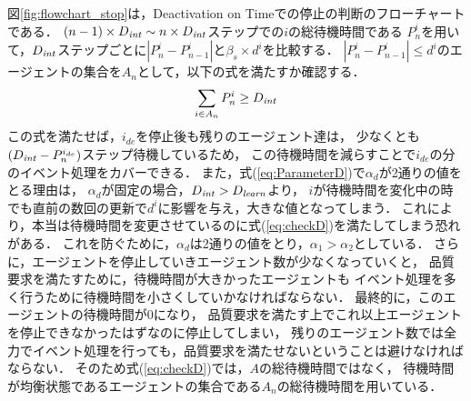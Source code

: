 \documentclass[12pt,a4j,twoside]{jarticle}
\def\AgentSet{A}
\def\DeactCheckInterval{D_{\it int}}
\def\DeactLearnInterval{D_{\it learn}}
\begin{document}
  図\ref{fig:flowchart_stop}は，Deactivation on Timeでの停止の判断のフローチャートである．
  $(n-1) \times \DeactCheckInterval \sim n \times \DeactCheckInterval$ステップでの$i$の総待機時間である
  $P^i_n$を用いて，$\DeactCheckInterval$ステップごとに$|P^i_n - P^i_{n-1}|$と$\beta_s \times d^i$を比較する．
  $|P^i_n - P^i_{n-1}| \leq d^i$のエージェントの集合を$A_n$として，以下の式を満たすか確認する．
  \begin{equation}\label{eq:checkD}
    \sum_{i \in A_n} P^i_n \geq \DeactCheckInterval
  \end{equation}
  この式を満たせば，$i_{de}$を停止後も残りのエージェント達は，
  少なくとも$(\DeactCheckInterval-P^{i_{de}}_n)$ステップ待機しているため，
  この待機時間を減らすことで$i_{de}$の分のイベント処理をカバーできる．
  また，式(\ref{eq:ParameterD})で$\alpha_d$が2通りの値をとる理由は，
  $\alpha_d$が固定の場合，$\DeactCheckInterval > \DeactLearnInterval$より，
  $i$が待機時間を変化中の時でも直前の数回の更新で$d^i$に影響を与え，大きな値となってしまう．
  これにより，本当は待機時間を変更させているのに式(\ref{eq:checkD})を満たしてしまう恐れがある．
  これを防ぐために，$\alpha_d$は2通りの値をとり，$\alpha_1 > \alpha_2$としている．
  さらに，エージェントを停止していきエージェント数が少なくなっていくと，
  品質要求を満たすために，待機時間が大きかったエージェントも
  イベント処理を多く行うために待機時間を小さくしていかなければならない．
  最終的に，このエージェントの待機時間が0になり，
  品質要求を満たす上でこれ以上エージェントを停止できなかったはずなのに停止してしまい，
  残りのエージェント数では全力でイベント処理を行っても，品質要求を満たせないということは避けなければならない．
  そのため式(\ref{eq:checkD})では，$\AgentSet$の総待機時間ではなく，
  待機時間が均衡状態であるエージェントの集合である$A_n$の総待機時間を用いている．
  \par
\end{document}
